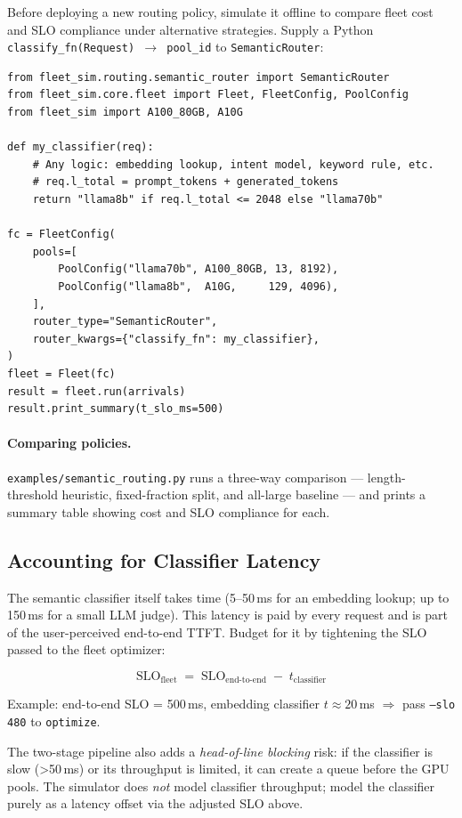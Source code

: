 \documentclass[11pt,a4paper]{article}
\begin{document}
Before deploying a new routing policy, simulate it offline to compare
fleet cost and SLO compliance under alternative strategies.  Supply a
Python \texttt{classify\_fn(Request) $\to$ pool\_id} to
\texttt{SemanticRouter}:

\begin{lstlisting}[style=python]
from fleet_sim.routing.semantic_router import SemanticRouter
from fleet_sim.core.fleet import Fleet, FleetConfig, PoolConfig
from fleet_sim import A100_80GB, A10G

def my_classifier(req):
    # Any logic: embedding lookup, intent model, keyword rule, etc.
    # req.l_total = prompt_tokens + generated_tokens
    return "llama8b" if req.l_total <= 2048 else "llama70b"

fc = FleetConfig(
    pools=[
        PoolConfig("llama70b", A100_80GB, 13, 8192),
        PoolConfig("llama8b",  A10G,     129, 4096),
    ],
    router_type="SemanticRouter",
    router_kwargs={"classify_fn": my_classifier},
)
fleet = Fleet(fc)
result = fleet.run(arrivals)
result.print_summary(t_slo_ms=500)
\end{lstlisting}

\paragraph{Comparing policies.}
\texttt{examples/semantic\_routing.py} runs a three-way comparison ---
length-threshold heuristic, fixed-fraction split, and all-large baseline
--- and prints a summary table showing cost and SLO compliance for each.

\subsection{Accounting for Classifier Latency}

The semantic classifier itself takes time (5--50\,ms for an embedding
lookup; up to 150\,ms for a small LLM judge).  This latency is paid by
every request and is part of the user-perceived end-to-end TTFT.  Budget
for it by tightening the SLO passed to the fleet optimizer:

\[
  \text{SLO}_{\text{fleet}} \;=\; \text{SLO}_{\text{end-to-end}} \;-\; t_{\text{classifier}}
\]

\noindent
Example: end-to-end SLO = 500\,ms, embedding classifier $t \approx 20$\,ms
$\Rightarrow$ pass \texttt{--slo 480} to \texttt{optimize}.

\begin{warning}
  The two-stage pipeline also adds a \emph{head-of-line blocking} risk: if
  the classifier is slow (>50\,ms) or its throughput is limited, it can
  create a queue before the GPU pools.  The simulator does \emph{not} model
  classifier throughput; model the classifier purely as a latency offset
  via the adjusted SLO above.
\end{warning}
\end{document}
